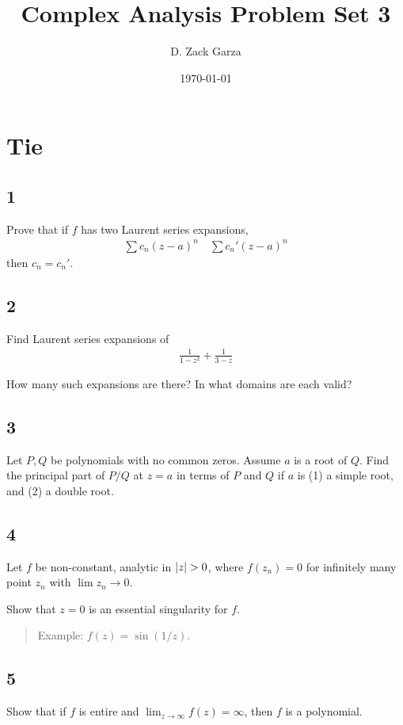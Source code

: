 \documentclass{scrreport}
\title{Complex Analysis Problem Set 3}
\author{D. Zack Garza}
\date{\today}
\DeclarePairedDelimiter\abs{\lvert}{\rvert}%
\begin{document}
\maketitle
\tableofcontents

\chapter{Tie}

\section{1}
Prove that if $f$ has two Laurent series expansions,
\begin{align}
    \sum c_n(z-a)^n \quad \sum c_n'(z-a)^n
\end{align}
then $c_n = c_n'$.

\section{2}
Find Laurent series expansions of
\begin{align}
    \frac{1}{1-z^2} + \frac{1}{3-z}
\end{align}

How many such expansions are there?
In what domains are each valid?

\section{3}

Let $P, Q$ be polynomials with no common zeros.
Assume $a$ is a root of $Q$. 
Find the principal part of $P/Q$ at $z=a$ in terms of $P$ and $Q$ if $a$ is (1) a simple root, and (2) a double root.

\section{4}
Let $f$ be non-constant, analytic in $\abs{z} > 0$, where $f(z_n) = 0$ for infinitely many point $z_n$ with $\lim z_n \to 0$.

Show that $z=0$ is an essential singularity for $f$.

\begin{quote}
    Example: $f(z) = \sin(1/z)$.
\end{quote}

\section{5}
Show that if $f$ is entire and $\lim_{z\to\infty}f(z) = \infty$, then $f$ is a polynomial.
\end{document}

